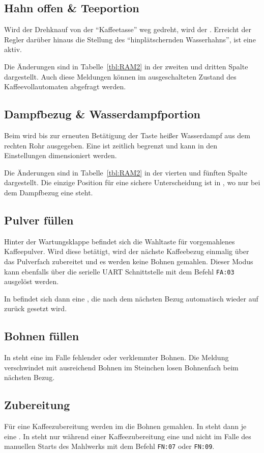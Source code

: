 \subsection{Hahn offen \& Teeportion}
Wird der Drehknauf von der "`Kaffeetasse"' weg gedreht, wird der .
Erreicht der Regler darüber hinaus die Stellung des "`hinplätschernden Wasserhahns"', ist eine  aktiv.

Die Änderungen sind in Tabelle~\ref{tbl:RAM2} in der zweiten und dritten Spalte dargestellt.
Auch diese Meldungen können im ausgeschalteten Zustand des Kaffeevollautomaten abgefragt werden.

\subsection{Dampfbezug \& Wasserdampfportion}
Beim  wird bis zur erneuten Betätigung der Taste heißer Wasserdampf aus dem rechten Rohr ausgegeben.
Eine  ist zeitlich begrenzt und kann in den Einstellungen dimensioniert werden.

Die Änderungen sind in Tabelle~\ref{tbl:RAM2} in der vierten und fünften Spalte dargestellt.
Die einzige Position für eine sichere Unterscheidung ist in , wo nur bei dem Dampfbezug eine  steht.

\subsection{Pulver füllen}
Hinter der Wartungsklappe befindet sich die Wahltaste für vorgemahlenes Kaffeepulver.
Wird diese betätigt, wird der nächste Kaffeebezug einmalig über das Pulverfach zubereitet und es werden keine Bohnen gemahlen.
Dieser Modus kann ebenfalls über die serielle \ac{UART} Schnittstelle mit dem Befehl \texttt{FA:03} ausgelöst werden.

In  befindet sich dann eine , die nach dem nächsten Bezug automatisch wieder auf  zurück gesetzt wird.

\subsection{Bohnen füllen}
In  steht eine  im Falle fehlender oder verklemmter Bohnen.
Die Meldung verschwindet mit ausreichend Bohnen im Steinchen losen Bohnenfach beim nächsten Bezug.

\subsection{Zubereitung}\label{subsec:RAM:Zubereitung} %
Für eine Kaffeezubereitung werden im  die Bohnen gemahlen.
In  steht dann je eine .
In  steht nur während einer Kaffeezubereitung eine  und nicht im Falle des manuellen Starts des Mahlwerks mit dem Befehl \texttt{FN:07} oder \texttt{FN:09}.

